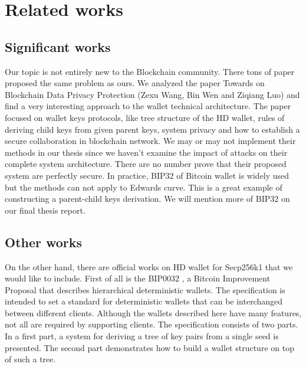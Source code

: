 \chapter{Related works}\label{chap: Related works}
\minitoc


\section{Significant works}
Our topic is not entirely new to the Blockchain community.
There tons of paper proposed the same problem as ours.
We analyzed the paper Towards on Blockchain Data Privacy Protection (Zexu Wang, Bin Wen and Ziqiang Luo) and find a very interesting approach to the wallet technical architecture. 
The paper focused on wallet keys protocols, like tree structure of the HD wallet, rules of deriving child keys from given parent keys, system privacy and how to establish a secure collaboration in blockchain network.
We may or may not implement their methods in our thesis since we haven't examine the impact of attacks on their complete system architecture. There are no number prove that their proposed system are perfectly secure.
In practice, BIP32 of Bitcoin wallet is widely used but the methods can not apply to Edwards curve. 
This is a great example of constructing a parent-child keys derivation. We will mention more of BIP32 on our final thesis report. 

\section{Other works}
On the other hand, there are official works on HD wallet for Secp256k1 that we would like to include. First of all is the BIP0032 \cite{github/bip0032}, a Bitcoin Improvement Proposal that describes hierarchical deterministic wallets. The specification is intended to set a standard for deterministic wallets that can be interchanged between different clients. Although the wallets described here have many features, not all are required by supporting clients. The specification consists of two parts. In a first part, a system for deriving a tree of key pairs from a single seed is presented. The second part demonstrates how to build a wallet structure on top of such a tree.